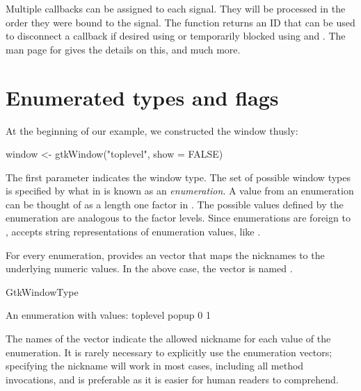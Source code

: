 Multiple callbacks can be assigned to each signal. They will be
processed in the order they were bound to the signal.  The
 function returns an ID that can be used to
disconnect a callback if desired using
 or temporarily blocked using
 and
. The man page for
 gives the details on this, and much more.


\section{Enumerated types and flags}

At the beginning of our example, we constructed the window thusly: 
\begin{Schunk}
\begin{Sinput}
 window <- gtkWindow("toplevel", show = FALSE)
\end{Sinput}
\end{Schunk}
%
The first parameter indicates the window type. The set of possible
window types is specified by what in  is known as an
\emph{enumeration}. A value from an enumeration can be thought of as a
length one factor in \R. The possible values defined by the
enumeration are analogous to the factor levels.  Since enumerations
are foreign to ,  accepts string
representations of enumeration values, like . 

For every  enumeration,  provides an 
vector that maps the nicknames to the underlying numeric values.  In
the above case, the vector is named .
\begin{Schunk}
\begin{Sinput}
 GtkWindowType
\end{Sinput}
\begin{Soutput}
An enumeration with values:
toplevel    popup 
       0        1 
\end{Soutput}
\end{Schunk}
%
The names of the vector indicate the allowed nickname for each value
of the enumeration. It is rarely necessary to explicitly use the
enumeration vectors; specifying the nickname will work in most cases,
including all method invocations, and is preferable as it is easier
for human readers to comprehend.

